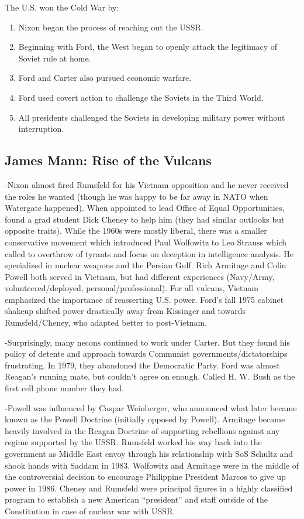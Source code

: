 \documentclass[
]{article}
\begin{document}
The U.S. won the Cold War by:

\begin{enumerate}
\def\labelenumi{\arabic{enumi}.}
\item
  Nixon began the process of reaching out the USSR.
\item
  Beginning with Ford, the West began to openly attack the legitimacy of
  Soviet rule at home.
\item
  Ford and Carter also pursued economic warfare.
\item
  Ford used covert action to challenge the Soviets in the Third World.
\item
  All presidents challenged the Soviets in developing military power
  without interruption.
\end{enumerate}

\hypertarget{james-mann-rise-of-the-vulcans}{%
\subsection{James Mann: Rise of the
Vulcans}\label{james-mann-rise-of-the-vulcans}}

-Nixon almost fired Rumsfeld for his Vietnam opposition and he never
received the roles he wanted (though he was happy to be far away in NATO
when Watergate happened). When appointed to lead Office of Equal
Opportunities, found a grad student Dick Cheney to help him (they had
similar outlooks but opposite traits). While the 1960s were mostly
liberal, there was a smaller conservative movement which introduced Paul
Wolfowitz to Leo Strauss which called to overthrow of tyrants and focus
on deception in intelligence analysis. He specialized in nuclear weapons
and the Persian Gulf. Rich Armitage and Colin Powell both served in
Vietnam, but had different experiences (Navy/Army, volunteered/deployed,
personal/professional). For all vulcans, Vietnam emphasized the
importance of reasserting U.S. power. Ford's fall 1975 cabinet shakeup
shifted power drastically away from Kissinger and towards
Rumsfeld/Cheney, who adapted better to post-Vietnam.

-Surprisingly, many necons continued to work under Carter. But they
found his policy of detente and approach towards Communist
governments/dictatorships frustrating. In 1979, they abandoned the
Democratic Party. Ford was almost Reagan's running mate, but couldn't
agree on enough. Called H. W. Bush as the first cell phone number they
had.

-Powell was influenced by Caspar Weinberger, who announced what later
became known as the Powell Doctrine (initially opposed by Powell).
Armitage became heavily involved in the Reagan Doctrine of supporting
rebellions against any regime supported by the USSR. Rumsfeld worked his
way back into the government as Middle East envoy through his
relationship with SoS Schultz and shook hands with Saddam in 1983.
Wolfowitz and Armitage were in the middle of the controversial decision
to encourage Philippine President Marcos to give up power in 1986.
Cheney and Rumsfeld were principal figures in a highly classified
program to establish a new American ``president'' and staff outside of
the Constitution in case of nuclear war with USSR.
\end{document}
